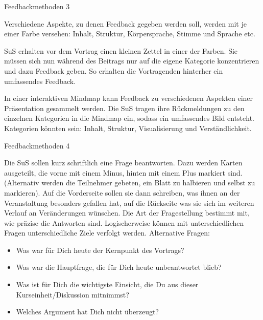 \documentclass[aspectratio=\BeamerAspectRatio]{beamer}
\begin{document}
\begin{frame}{Feedbackmethoden 3}
\footnotesize
  \begin{mynote}[Feedbackanker]
Verschiedene Aspekte, zu denen Feedback gegeben werden soll, werden mit je einer Farbe
versehen: Inhalt, Struktur, Körpersprache, Stimme und Sprache etc.

SuS erhalten vor dem Vortrag einen kleinen Zettel in einer der Farben. Sie müssen sich
nun während des Beitrags nur auf die eigene Kategorie konzentrieren und dazu Feedback geben. 
So erhalten die Vortragenden hinterher ein umfassendes Feedback.
  \end{mynote}
  \begin{mynote}
    In einer interaktiven Mindmap kann Feedback zu verschiedenen Aspekten einer Präsentation gesammelt werden. Die SuS tragen ihre Rückmeldungen zu den einzelnen Kategorien in die Mindmap ein, sodass ein umfassendes Bild entsteht. Kategorien könnten sein: Inhalt, Struktur, Visualisierung und Verständlichkeit. 
  \end{mynote}
\end{frame}

\begin{frame}{Feedbackmethoden 4}
  \footnotesize
\begin{mynote}
  Die SuS sollen kurz schriftlich eine Frage beantworten.
Dazu werden Karten ausgeteilt, die vorne mit einem Minus, hinten mit einem Plus markiert sind.
(Alternativ werden die Teilnehmer gebeten, ein Blatt zu halbieren und selbst zu markieren).
Auf die Vorderseite sollen sie dann schreiben, was ihnen an der Veranstaltung besonders gefallen
hat, auf die Rückseite was sie sich im weiteren Verlauf an Veränderungen wünschen.
Die Art der Fragestellung bestimmt mit, wie präzise die Antworten sind. Logischerweise können mit
unterschiedlichen Fragen unterschiedliche Ziele verfolgt werden.
Alternative Fragen:
\begin{itemize}
\item Was war für Dich heute der Kernpunkt des Vortrags?
\item Was war die Hauptfrage, die für Dich heute unbeantwortet blieb?
\item Was ist für Dich die wichtigste Einsicht, die Du aus dieser Kurseinheit/Diskussion mitnimmst?
\item Welches Argument hat Dich nicht überzeugt?
\end{itemize}
\end{mynote}
\end{frame}
\end{document}
